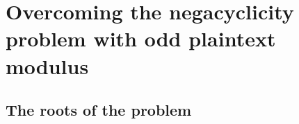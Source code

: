 \section{Overcoming the negacyclicity problem with odd plaintext modulus}


\subsection{The roots of the problem}



